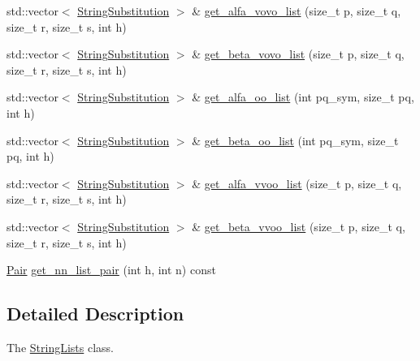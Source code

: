 \begin{DoxyCompactItemize}
\item 
std\+::vector$<$ \mbox{\hyperlink{structforte_1_1_string_substitution}{String\+Substitution}} $>$ \& \mbox{\hyperlink{classforte_1_1_string_lists_ae404d3a831c8d9a0512739d1ab988160}{get\+\_\+alfa\+\_\+vovo\+\_\+list}} (size\+\_\+t p, size\+\_\+t q, size\+\_\+t r, size\+\_\+t s, int h)
\item 
std\+::vector$<$ \mbox{\hyperlink{structforte_1_1_string_substitution}{String\+Substitution}} $>$ \& \mbox{\hyperlink{classforte_1_1_string_lists_aec1c0e66083e28ab65db2328c95747eb}{get\+\_\+beta\+\_\+vovo\+\_\+list}} (size\+\_\+t p, size\+\_\+t q, size\+\_\+t r, size\+\_\+t s, int h)
\item 
std\+::vector$<$ \mbox{\hyperlink{structforte_1_1_string_substitution}{String\+Substitution}} $>$ \& \mbox{\hyperlink{classforte_1_1_string_lists_a90100286fa794c4b7784229803bbc8e2}{get\+\_\+alfa\+\_\+oo\+\_\+list}} (int pq\+\_\+sym, size\+\_\+t pq, int h)
\item 
std\+::vector$<$ \mbox{\hyperlink{structforte_1_1_string_substitution}{String\+Substitution}} $>$ \& \mbox{\hyperlink{classforte_1_1_string_lists_a435184ea8affdbddbad11d7c8d8baaa2}{get\+\_\+beta\+\_\+oo\+\_\+list}} (int pq\+\_\+sym, size\+\_\+t pq, int h)
\item 
std\+::vector$<$ \mbox{\hyperlink{structforte_1_1_string_substitution}{String\+Substitution}} $>$ \& \mbox{\hyperlink{classforte_1_1_string_lists_a73fa8f1b1ea45d6ec18486f50144849f}{get\+\_\+alfa\+\_\+vvoo\+\_\+list}} (size\+\_\+t p, size\+\_\+t q, size\+\_\+t r, size\+\_\+t s, int h)
\item 
std\+::vector$<$ \mbox{\hyperlink{structforte_1_1_string_substitution}{String\+Substitution}} $>$ \& \mbox{\hyperlink{classforte_1_1_string_lists_a6546883e1e65cf13d0920babf82f0191}{get\+\_\+beta\+\_\+vvoo\+\_\+list}} (size\+\_\+t p, size\+\_\+t q, size\+\_\+t r, size\+\_\+t s, int h)
\item 
\mbox{\hyperlink{namespaceforte_adfa942eeeeb54ae31f5d6f4d1e4e0641}{Pair}} \mbox{\hyperlink{classforte_1_1_string_lists_a3d43ad114eafe0375fb9c223d36d0c25}{get\+\_\+nn\+\_\+list\+\_\+pair}} (int h, int n) const
\end{DoxyCompactItemize}


\subsection{Detailed Description}
The \mbox{\hyperlink{classforte_1_1_string_lists}{String\+Lists}} class. 

